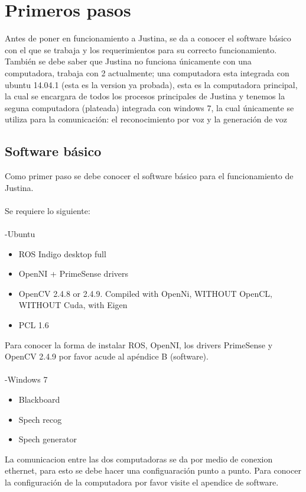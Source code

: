 \documentclass[user_manual.tex]{subfiles}
\begin{document}
 \chapter{Primeros pasos}
 Antes de poner en funcionamiento a Justina, se da a conocer el software básico con el que se trabaja y los requerimientos para  su correcto funcionamiento. También se debe saber que Justina no funciona únicamente con una computadora, trabaja con 2 actualmente; una computadora esta integrada con ubuntu 14.04.1 (esta es la version ya probada), esta es la computadora principal, la cual se encargara de todos los procesos principales de Justina y tenemos la seguna computadora (plateada) integrada con windows 7, la cual únicamente se utiliza para la comunicación: el reconocimiento por voz y la generación de voz\\
 
 \section{Software básico}
Como primer paso se debe conocer el software básico para el funcionamiento de Justina.\\
\\
Se requiere lo siguiente:\\
\\
-Ubuntu
\begin{itemize}
\item ROS Indigo desktop full
\item OpenNI + PrimeSense drivers
\item OpenCV 2.4.8 or 2.4.9. Compiled with OpenNi, WITHOUT OpenCL, WITHOUT Cuda, with Eigen
\item PCL 1.6
\end{itemize}

Para conocer la forma de instalar ROS, OpenNI, los drivers PrimeSense y OpenCV 2.4.9 por favor acude al apéndice B (software).\\
\\
-Windows 7
\begin{itemize}
\item Blackboard
\item Spech recog
\item Spech generator
\end{itemize}

La comunicacion entre las dos computadoras se da por medio de conexion ethernet, para esto se debe hacer una configuaración punto a punto. Para conocer la configuración de la computadora por favor visite el apendice de software.
\end{document}
